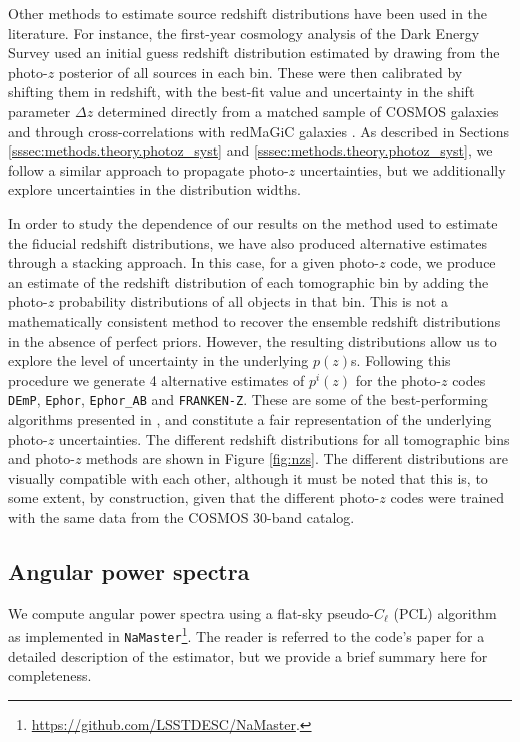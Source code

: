 \documentclass[a4paper,11pt]{article}
\begin{document}
    Other methods to estimate source redshift distributions have been used in the literature. For instance, the first-year cosmology analysis of the Dark Energy Survey \citep{1708.01530,2018MNRAS.478..592H} used an initial guess redshift distribution estimated by drawing from the photo-$z$ posterior of all sources in each bin. These were then calibrated by shifting them in redshift, with the best-fit value and uncertainty in the shift parameter $\Delta z$ determined directly from a matched sample of COSMOS galaxies \citep{2018MNRAS.478..592H} and through cross-correlations with redMaGiC galaxies \citep{2018MNRAS.481.2427C}. As described in Sections \ref{sssec:methods.theory.photoz_syst} and \ref{sssec:methods.theory.photoz_syst}, we follow a similar approach to propagate photo-$z$ uncertainties, but we additionally explore uncertainties in the distribution widths.

    In order to study the dependence of our results on the method used to estimate the fiducial redshift distributions, we have also produced alternative estimates through a stacking approach. In this case, for a given photo-$z$ code, we produce an estimate of the redshift distribution of each tomographic bin by adding the photo-$z$ probability distributions of all objects in that bin. This is not a mathematically consistent method to recover the ensemble redshift distributions in the absence of perfect priors. However, the resulting distributions allow us to explore the level of uncertainty in the underlying $p(z)$s. Following this procedure we generate 4 alternative estimates of $p^i(z)$ for the photo-$z$ codes {\tt DEmP}, {\tt Ephor}, {\tt Ephor\_AB} and {\tt FRANKEN-Z}. These are some of the best-performing algorithms presented in \cite{2018PASJ...70S...9T}, and constitute a fair representation of the underlying photo-$z$ uncertainties. The different redshift distributions for all tomographic bins and photo-$z$ methods are shown in Figure \ref{fig:nzs}. The different distributions are visually compatible with each other, although it must be noted that this is, to some extent, by construction, given that the different photo-$z$ codes were trained with the same data from the COSMOS 30-band catalog.

  \subsection{Angular power spectra}\label{ssec:methods.cell}
    We compute angular power spectra using a flat-sky pseudo-$C_\ell$ (PCL) algorithm \citep{2002ApJ...567....2H} as implemented in {\tt NaMaster}\footnote{\url{https://github.com/LSSTDESC/NaMaster}.}. The reader is referred to the code's paper \cite{2019MNRAS.484.4127A} for a detailed description of the estimator, but we provide a brief summary here for completeness.
    
\end{document}
